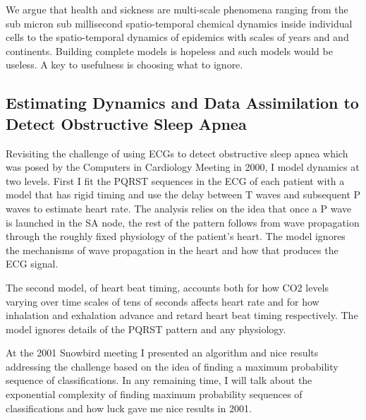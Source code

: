 \documentclass{article}
\begin{document}
We argue that health and sickness are multi-scale phenomena ranging
from the sub micron sub millisecond spatio-temporal chemical dynamics
inside individual cells to the spatio-temporal dynamics of epidemics
with scales of years and and continents.  Building complete models is
hopeless and such models would be useless.  A key to usefulness is
choosing what to ignore.


\subsection*{Estimating Dynamics and Data Assimilation to Detect
  Obstructive Sleep Apnea}
\label{sec:estimating}

Revisiting the challenge of using ECGs to detect obstructive sleep
apnea which was posed by the Computers in Cardiology Meeting in 2000,
I model dynamics at two levels.  First I fit the PQRST sequences in
the ECG of each patient with a model that has rigid timing and use
the delay between T waves and subsequent P waves to estimate heart
rate.  The analysis relies on the idea that once a P wave is launched
in the SA node, the rest of the pattern follows from wave propagation
through the roughly fixed physiology of the patient's heart.  The
model ignores the mechanisms of wave propagation in the heart and how
that produces the ECG signal.

The second model, of heart beat timing, accounts both for how CO2
levels varying over time scales of tens of seconds affects heart rate
and for how inhalation and exhalation advance and retard heart beat
timing respectively.  The model ignores details of the PQRST pattern
and any physiology.

At the 2001 Snowbird meeting I presented an algorithm and nice results
addressing the challenge based on the idea of finding a maximum
probability sequence of classifications.  In any remaining time, I
will talk about the exponential complexity of finding maximum
probability sequences of classifications and how luck gave me nice
results in 2001.
\end{document}
